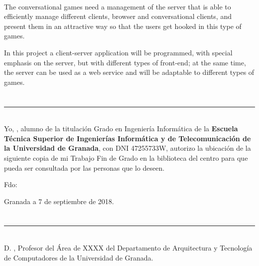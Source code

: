 \vspace{0.7cm}
\\

The conversational games need a management of the server that is able to efficiently manage different clients, browser and conversational clients, and present them in an attractive way so that the users get hooked in this type of games.

In this project a client-server application will be programmed, with special emphasis on the server, but with different types of front-end; at the same time, the server can be used as a web service and will be adaptable to different types of games.
\chapter*{}
\thispagestyle{empty}

\noindent\rule[-1ex]{\textwidth}{2pt}\\[4.5ex]

Yo, \textbf{\myName}, alumno de la titulación Grado en Ingeniería Informática de la \textbf{Escuela Técnica Superior
de Ingenierías Informática y de Telecomunicación de la Universidad de Granada}, con DNI 47255733W, autorizo la
ubicación de la siguiente copia de mi Trabajo Fin de Grado en la biblioteca del centro para que pueda ser
consultada por las personas que lo deseen.

\vspace{6cm}

\noindent Fdo: \myName

\vspace{2cm}

\begin{flushright}
Granada a 7 de septiembre de 2018.
\end{flushright}


\chapter*{}
\thispagestyle{empty}

\noindent\rule[-1ex]{\textwidth}{2pt}\\[4.5ex]

D. \textbf{\myProf}, Profesor del Área de XXXX del Departamento de Arquitectura y Tecnología de Computadores de la Universidad de Granada.

\vspace{0.5cm}


\vspace{0.5cm}

